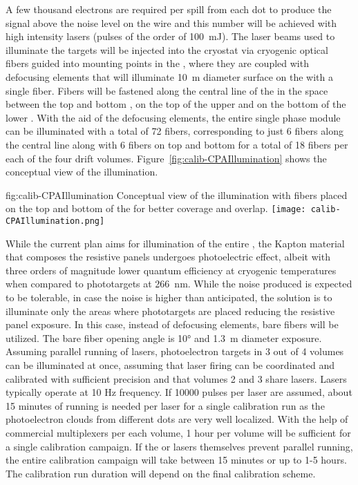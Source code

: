 A few thousand electrons are required per spill from each dot to produce the signal above the noise level on the wire and this number will be achieved with high intensity lasers (pulses of the order of \SI{100}{\milli\joule}). The laser beams used to illuminate the targets will be injected into the cryostat via cryogenic optical fibers guided into mounting points in the , where they are coupled with defocusing elements that will illuminate \SI{10}{\m} diameter surface on the   with a single fiber. Fibers will be fastened along the central line of the  in the space between the top and bottom , on the top of the upper  and on the bottom of the lower . With the aid of the defocusing elements, the entire single phase module can be illuminated with a total of \num{72} fibers, corresponding to just \num{6} fibers along the central line along with \num{6} fibers on top and bottom for a total of \num{18} fibers per each of the four drift volumes. Figure~\ref{fig:calib-CPAIllumination} shows the conceptual view of the  illumination.

\begin{dunefigure}{fig:calib-CPAIllumination}
{Conceptual view of the  illumination with fibers placed on the top and bottom of the  for better coverage and overlap.} 
\texttt{[image: calib-CPAIllumination.png]} 
\end{dunefigure}


While the current plan aims for illumination of the entire , the Kapton material that composes the resistive panels undergoes photoelectric effect, albeit with three orders of magnitude lower quantum efficiency at cryogenic temperatures when compared to phototargets at \SI{266}{\nano\m}. While the noise produced is expected to be tolerable, in case the noise is higher than anticipated, the solution is to illuminate only the areas where phototargets are placed reducing the resistive panel exposure. In this case, instead of defocusing elements, bare fibers will be utilized. The bare fiber opening angle is \ang{10} and \SI{1.3}{\m} diameter exposure.   
Assuming parallel running of lasers, photoelectron targets in 3 out of 4 volumes can be illuminated at once, assuming that laser firing can be coordinated and calibrated with sufficient precision and that volumes 2 and 3 share lasers. Lasers typically operate at 10 Hz frequency. If 10000 pulses per laser are assumed, about 15 minutes of running is needed per laser for a single calibration run
as the photoelectron clouds from different dots are very well localized.
With the help of commercial multiplexers per each volume, 1 hour per volume will be sufficient for a single calibration campaign. If the  or lasers themselves prevent parallel running, the entire calibration campaign will take between 15 minutes or up to 1-5 hours. The calibration run duration will depend on the final calibration scheme.

